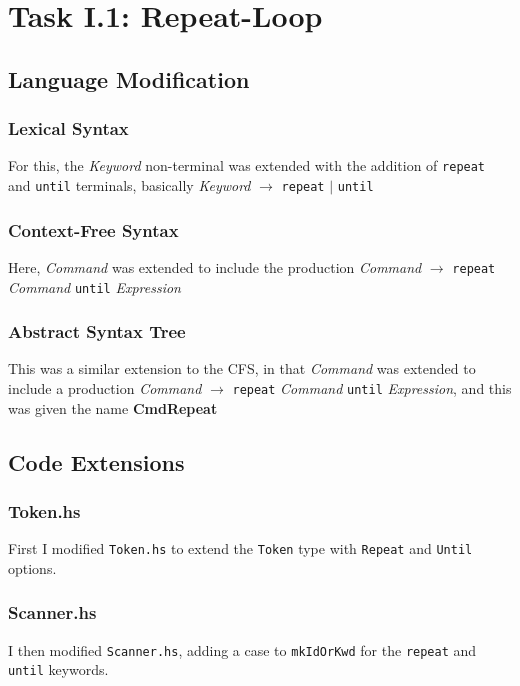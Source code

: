 \documentclass[12pt]{article}
\newcommand{\lstin}[3]{
  
}
\begin{document}
\maketitle
\tableofcontents
\pagebreak
\section{Task I.1: Repeat-Loop}
\subsection{Language Modification}
\subsubsection{Lexical Syntax}
For this, the \textit{Keyword} non-terminal was extended with the addition of \verb|repeat| and \verb|until| terminals, basically \textit{Keyword} $\rightarrow$ \verb|repeat| $|$ \verb|until|

\subsubsection{Context-Free Syntax}
Here, \textit{Command} was extended to include the production \textit{Command} $\rightarrow$ \verb|repeat| \textit{Command} \verb|until| \textit{Expression}

\subsubsection{Abstract Syntax Tree}
This was a similar extension to the CFS, in that \textit{Command} was extended to include a production \textit{Command} $\rightarrow$ \verb|repeat| \textit{Command} \verb|until| \textit{Expression}, and this was given the name \textbf{CmdRepeat}


\subsection{Code Extensions}
\subsubsection{Token.hs}
First I modified \verb|Token.hs| to extend the \verb|Token| type with \verb|Repeat| and \verb|Until| options.

\lstin{47}{48}{Token.hs}

\subsubsection{Scanner.hs}
I then modified \verb|Scanner.hs|, adding a case to \verb|mkIdOrKwd| for the \verb|repeat| and \verb|until| keywords.
\end{document}
